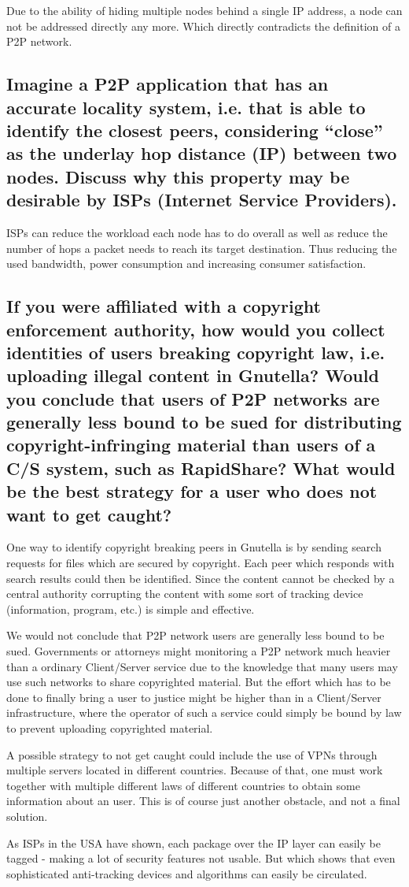 \documentclass{article}
\begin{document}
Due to the ability of hiding multiple nodes behind a single IP address, a node
can not be addressed directly any more. Which directly contradicts the
definition of a P2P network.

\subsection{Imagine a P2P application that has an accurate locality system, i.e.
that is able to identify the closest peers, considering “close” as the underlay
hop distance (IP) between two nodes. Discuss why this property may be desirable
by ISPs (Internet Service Providers).}

ISPs can reduce the workload each node has to do overall as well as reduce the
number of hops a packet needs to reach its target destination. Thus reducing the
used bandwidth, power consumption and increasing consumer satisfaction.

\subsection{If you were affiliated with a copyright enforcement authority, how
would you collect identities of users breaking copyright law, i.e. uploading
illegal content in Gnutella? Would you conclude that users of P2P networks are
generally less bound to be sued for distributing copyright-infringing material
than users of a C/S system, such as RapidShare? What would be the best strategy
for a user who does not want to get caught?}

One way to identify copyright breaking peers in Gnutella is by sending search
requests for files which are secured by copyright. Each peer which responds with
search  results could then be identified. Since the content cannot be checked by
a central authority corrupting the content with some sort of tracking device
(information, program, etc.) is simple and effective.

We would not conclude that P2P network users are generally less bound to be
sued. Governments or attorneys might monitoring a P2P network  much heavier than
a ordinary Client/Server service due to the knowledge that many users may use
such networks to share copyrighted material. But the effort which has to be done
to finally bring a user to justice might be higher than in a Client/Server
infrastructure,  where the operator of such a service could simply be bound by
law to prevent uploading copyrighted material.

A possible strategy to not get caught could include the use of VPNs through
multiple servers located in different countries. Because of that, one must work
together with multiple different laws of different countries to obtain some
information about an user. This is of course just another obstacle, and not a
final solution.

As ISPs in the USA have shown, each package over the IP layer can easily be
tagged - making a lot of security features not usable. But which shows that even
sophisticated anti-tracking devices and algorithms can easily be circulated.
\end{document}
